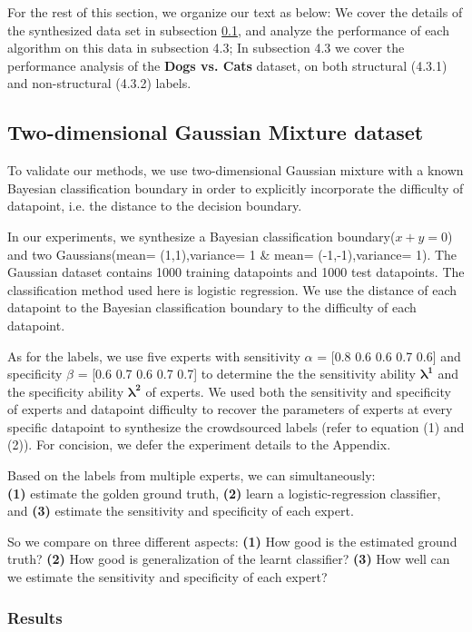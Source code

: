For the rest of this section, we organize our text as below:
We cover the details of the synthesized data set in subsection \ref{4.2}, and analyze the performance of each algorithm on this data in subsection 4.3;  In subsection 4.3 we cover the performance analysis of the \textbf{Dogs vs. Cats} dataset, on both structural (4.3.1) and non-structural (4.3.2) labels.

\subsection{Two-dimensional Gaussian Mixture dataset}\label{4.2}

To validate our methods, we use two-dimensional Gaussian mixture with a known Bayesian classification boundary in order to explicitly incorporate the difficulty of datapoint, i.e. the distance to the decision boundary.

In our experiments, we synthesize a Bayesian classification boundary($x+y=0$) and two Gaussians(mean= (1,1),variance= 1 \& mean= (-1,-1),variance= 1). The Gaussian dataset contains 1000 training datapoints and 1000 test datapoints. The classification method used here is logistic regression. We use the distance of each  datapoint to the Bayesian classification boundary to the difficulty of each datapoint.

As for the labels, we use five experts with sensitivity $\alpha$ = [0.8 0.6 0.6 0.7 0.6] and specificity $\beta$ = [0.6 0.7 0.6 0.7 0.7] to determine the the sensitivity ability $\bm{\lambda^1}$ and the specificity ability $\bm{\lambda^2}$ of experts. We used both the sensitivity and specificity of experts and datapoint difficulty to recover the parameters of experts at every specific datapoint to synthesize the crowdsourced labels (refer to equation (1) and (2)). For concision, we defer the experiment details to the Appendix.

Based on the labels from multiple experts, we can simultaneously:\\ \textbf{(1)} estimate the golden ground truth, \textbf{(2)} learn a logistic-regression classifier, and \textbf{(3)} estimate the sensitivity and specificity of each expert.

So we compare on three different aspects:
    \textbf{(1)} How good is the estimated ground truth?
    \textbf{(2)} How good is generalization of the learnt classifier?
    \textbf{(3)} How well can we estimate the sensitivity and specificity of each expert?


\subsubsection{Results}


